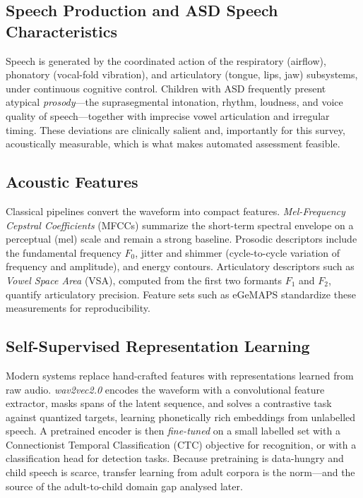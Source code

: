 \documentclass[conference]{IEEEtran}
\begin{document}
\subsection{Speech Production and ASD Speech Characteristics}
Speech is generated by the coordinated action of the respiratory (airflow), phonatory (vocal-fold vibration), and articulatory (tongue, lips, jaw) subsystems, under continuous cognitive control. Children with ASD frequently present atypical \emph{prosody}---the suprasegmental intonation, rhythm, loudness, and voice quality of speech---together with imprecise vowel articulation and irregular timing. These deviations are clinically salient and, importantly for this survey, acoustically measurable, which is what makes automated assessment feasible.

\subsection{Acoustic Features}
Classical pipelines convert the waveform into compact features. \emph{Mel-Frequency Cepstral Coefficients} (MFCCs) summarize the short-term spectral envelope on a perceptual (mel) scale and remain a strong baseline. Prosodic descriptors include the fundamental frequency $F_0$, jitter and shimmer (cycle-to-cycle variation of frequency and amplitude), and energy contours. Articulatory descriptors such as \emph{Vowel Space Area} (VSA), computed from the first two formants $F_1$ and $F_2$, quantify articulatory precision. Feature sets such as eGeMAPS standardize these measurements for reproducibility.

\subsection{Self-Supervised Representation Learning}
Modern systems replace hand-crafted features with representations learned from raw audio. \emph{wav2vec2.0} encodes the waveform with a convolutional feature extractor, masks spans of the latent sequence, and solves a contrastive task against quantized targets, learning phonetically rich embeddings from unlabelled speech. A pretrained encoder is then \emph{fine-tuned} on a small labelled set with a Connectionist Temporal Classification (CTC) objective for recognition, or with a classification head for detection tasks. Because pretraining is data-hungry and child speech is scarce, transfer learning from adult corpora is the norm---and the source of the adult-to-child domain gap analysed later.
\end{document}
